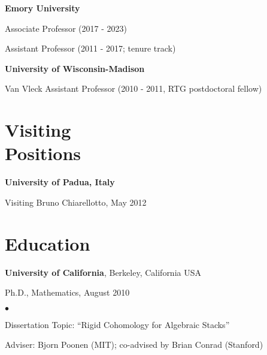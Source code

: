 \documentclass[margin,line]{res}
\newenvironment{list1}{
  \begin{list}{\ding{113}}{%
      \setlength{\itemsep}{0in}
      \setlength{\parsep}{0in} \setlength{\parskip}{0in}
      \setlength{\topsep}{0in} \setlength{\partopsep}{0in}
      \setlength{\leftmargin}{0.17in}}}{\end{list}}
\newenvironment{list2}{
  \begin{list}{$\bullet$}{%
      \setlength{\itemsep}{0in}
      \setlength{\parsep}{0in} \setlength{\parskip}{0in}
      \setlength{\topsep}{0in} \setlength{\partopsep}{0in}
      \setlength{\leftmargin}{0.2in}}}{\end{list}}
\begin{document}
\begin{resume}
{\bf Emory University } \\
  \vspace*{-.15in}
  \begin{list1}
  \item[] Associate Professor (2017 - 2023)
  \item[] Assistant Professor (2011 - 2017; tenure track)


  \end{list1}
\vspace{-7pt}

{\bf University of Wisconsin-Madison } \\
  \vspace*{-.15in}
  \begin{list1}
  \item[] Van Vleck Assistant Professor (2010 - 2011, RTG postdoctoral fellow)

  \end{list1}

\section{\sc Visiting \\ Positions}
{\bf University of Padua, Italy}\\
  \vspace*{-.15in}
  \begin{list1}
  \item[]  Visiting Bruno Chiarellotto, May 2012 
  \end{list1}

\section{\sc Education}
{\bf University of California}, Berkeley, California USA\\
  \vspace*{-.15in}
  \begin{list1}
  \item[] Ph.D., Mathematics, August 2010
    \begin{list2}
      \vspace*{.00in}
    \item [] Dissertation Topic: ``Rigid Cohomology for Algebraic Stacks''
    \item [] Adviser: Bjorn Poonen (MIT); co-advised by Brian Conrad (Stanford)
    \end{list2}
  \end{list1}
\vspace{-7pt}


\end{resume}
\end{document}
